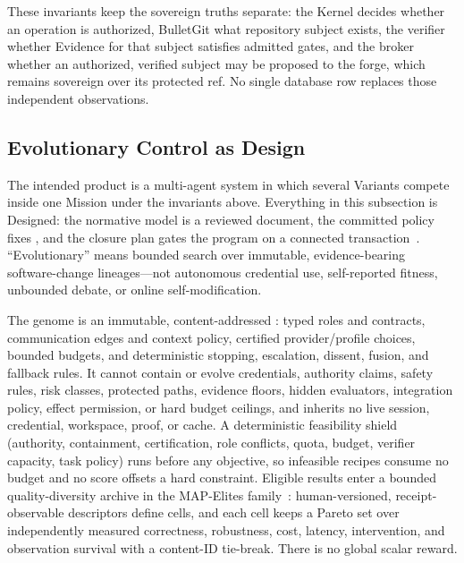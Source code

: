 \documentclass[journal]{IEEEtran}
\newcommand{\Designed}{\textsf{Designed}}
\newcommand{\code}[1]{\texttt{\detokenize{#1}}}
\begin{document}
These invariants keep the sovereign truths separate: the Kernel decides
whether an operation is authorized, BulletGit what repository subject exists,
the verifier whether Evidence for that subject satisfies admitted gates, and
the broker whether an authorized, verified subject may be proposed to the
forge, which remains sovereign over its protected ref. No single database row
replaces those independent observations.

\subsection{Evolutionary Control as Design}
\label{sec:evo}

The intended product is a multi-agent system in which several Variants compete
inside one Mission under the invariants above. Everything in this subsection is
\Designed: the normative model is a reviewed document, the committed policy
fixes \code{evolutionary_authority=false}, and the closure plan gates the
program on a connected transaction~\cite{bulletEvo,bulletPolicy,bulletClosure}.
``Evolutionary'' means bounded search over immutable, evidence-bearing
software-change lineages---not autonomous credential use, self-reported
fitness, unbounded debate, or online self-modification.

The genome is an immutable, content-addressed \code{TeamRecipe}: typed roles
and contracts, communication edges and context policy, certified
provider/profile choices, bounded budgets, and deterministic stopping,
escalation, dissent, fusion, and fallback rules. It cannot contain or evolve
credentials, authority claims, safety rules, risk classes, protected paths,
evidence floors, hidden evaluators, integration policy, effect permission, or
hard budget ceilings, and inherits no live session, credential, workspace,
proof, or cache. A deterministic feasibility shield (authority, containment,
certification, role conflicts, quota, budget, verifier capacity, task policy)
runs before any objective, so infeasible recipes consume no budget and no
score offsets a hard constraint. Eligible results enter a bounded quality-diversity archive in the MAP-Elites
family~\cite{mouret2015,pugh2016}: human-versioned, receipt-observable
descriptors define cells, and each cell keeps a Pareto set over independently
measured correctness, robustness, cost, latency, intervention, and observation
survival with a content-ID tie-break. There is no global scalar reward.
\end{document}
